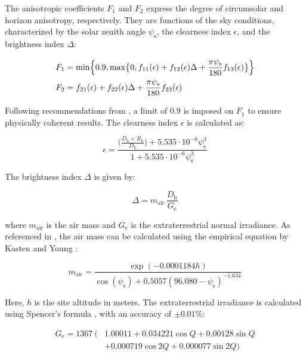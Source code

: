\noindent
The anisotropic coefficients \(F_{1}\) and \(F_{2}\) express the degree of circumsolar and horizon anisotropy,
respectively. They are functions of the sky conditions, characterized by the solar zenith angle
\(\psi_{\text{s}}\), the clearness index \(\epsilon\), and the brightness index \(\Delta\):

\begin{align}
    F_{1} &= \min \Bigl\{ 0.9, \max\bigl\{0, f_{11}(\epsilon) + f_{12}(\epsilon)\Delta + \frac{\pi \psi_{\text{s}}}{180}f_{13}(\epsilon) \bigr\} \Bigr\}
    \label{eq:brightness_coefficient_circumsolar} \\
    F_{2} &= f_{21}(\epsilon) + f_{22}(\epsilon)\Delta + \frac{\pi \psi_{s}}{180}f_{23}(\epsilon)
    \label{eq:brightness_coefficient_horizon}
\end{align}

\noindent
Following recommendations from \cite{PerezDriesse2024}, a limit of 0.9 is imposed on \(F_{1}\) to
ensure physically coherent results. The clearness index \(\epsilon\) is calculated as:

\begin{equation}
    \epsilon = \frac{\bigl(\frac{D_{\text{h}} + B_{\text{n}}}{D_{\text{h}}}\bigl) + 5.535\cdot10^{-6} \psi_{\text{s}}^3}{1 + 5.535\cdot10^{-6} \psi_{\text{s}}^{3}}
\end{equation}

\noindent
The brightness index \(\Delta\) is given by:

\begin{equation}
    \Delta = m_{\text{air}} \, \frac{D_{\text{h}}}{G_{\text{e}}}
\end{equation}

\noindent
where \(m_{\text{air}}\) is the air mass and \(G_{\text{e}}\) is the extraterrestrial normal irradiance.
As referenced in \cite{Toledo}, the air mass can be calculated using the empirical
equation by Kasten and Young \cite{Karsten}:

\begin{equation}
    m_{\text{air}} = \frac{\exp(-0.0001184h)}{\cos(\psi_{\text{s}}) + 0.5057(96.080 - \psi_{\text{s}})^{-1.634}}
\end{equation}

\noindent
Here, \(h\) is the site altitude in meters. The extraterrestrial irradiance is calculated using 
Spencer's formula \cite{Spencer1971Fourier}, with an accuracy of \(\pm0.01\%\):

\begin{align}
    G_{\text{e}} = 1367 \: \bigl(&1.00011 + 0.034221 \cos Q + 0.00128 \sin Q \nonumber \\ 
                     &+ 0.000719 \cos 2Q + 0.000077 \sin2Q\bigr)
\end{align}

